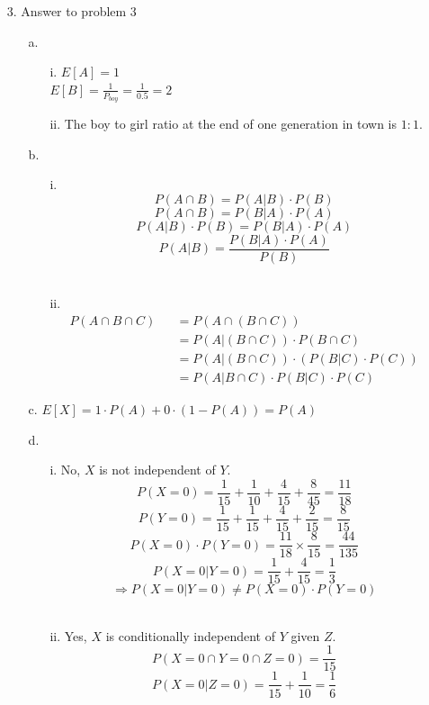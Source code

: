 \begin{enumerate}
\pagebreak
\item[3.] Answer to problem 3
	\begin{enumerate}
	\item[a.]
		\begin{enumerate}
		\item[i.] $E[A] = 1$\\
				$E[B] = \frac{1}{P_{boy}} = \frac{1}{0.5} = 2$ \\
		\item[ii.] The boy to girl ratio at the end of one generation in town is $1:1$.\\
		\end{enumerate}
	\item[b.]
		\begin{enumerate}
		\item[i.] 
			\[ P(A \cap B) = P(A|B) \cdot P(B) \]
			\[ P(A \cap B) = P(B|A) \cdot P(A) \]
			\[ P(A|B) \cdot P(B) = P(B|A) \cdot P(A) \]
			\[ P(A|B) = \frac{P(B|A) \cdot P(A)}{P(B)} \] \\
		\item[ii.]
			\begin{eqnarray}
			P(A \cap B \cap C) && = P(A \cap (B \cap C))\\
							   && = P(A|(B \cap C)) \cdot P(B \cap C)\\
							   && = P(A|(B \cap C)) \cdot (P(B|C) \cdot P(C))\\
							   && = P(A|B \cap C) \cdot P(B|C) \cdot P(C)
			\end{eqnarray}
		\end{enumerate}
	\item[c.] $E[X] = 1 \cdot P(A) + 0 \cdot (1 - P(A)) = P(A)$ \\
	\item[d.]
		\begin{enumerate}
		\item[i.] No, $X$ is not independent of $Y$.
		\[ P(X=0) = \frac{1}{15}  + \frac{1}{10} + \frac{4}{15} + \frac{8}{45} = \frac{11}{18} \]
		\[ P(Y=0) = \frac{1}{15}  + \frac{1}{15} + \frac{4}{15} + \frac{2}{15} = \frac{8}{15} \]
		\[ P(X=0) \cdot P(Y=0) = \frac{11}{18} \times \frac{8}{15} = \frac{44}{135} \]
		\[ P(X=0|Y=0) = \frac{1}{15} + \frac{4}{15} = \frac{1}{3} \]
		\[ \Rightarrow P(X=0|Y=0) \neq P(X=0) \cdot P(Y=0) \]\\
		\item[ii.] Yes, $X$ is conditionally independent of $Y$ given $Z$.
		\[ P(X=0 \cap Y=0 \cap Z=0) = \frac{1}{15} \]
		\[ P(X=0|Z=0) = \frac{1}{15} + \frac{1}{10} = \frac{1}{6} \]

\end{enumerate}
\end{enumerate}
\end{enumerate}
